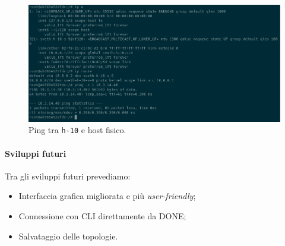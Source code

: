 \begin{figure}[h!]
    \centering
    \includegraphics[width=14cm]{../images/poc_4.png}
    \caption[short]{Ping tra \texttt{h-10} e host fisico.}
\end{figure}
\paragraph*{Sviluppi futuri}
Tra gli sviluppi futuri prevediamo:
\begin{itemize}
    \item Interfaccia grafica migliorata e più \textit{user-friendly};
    \item Connessione con CLI direttamente da DONE;
    \item Salvataggio delle topologie.
\end{itemize}




\newpage